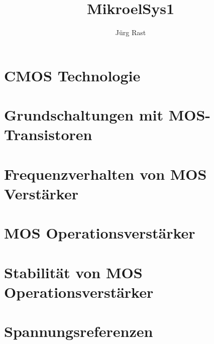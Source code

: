 \documentclass[titlepage=true]{scrartcl}
\title{MikroelSys1}
\author{Jürg Rast}
\begin{document}

\tableofcontents
\newpage

\section{CMOS Technologie}





\section{Grundschaltungen mit MOS-Transistoren}









\section{Frequenzverhalten von MOS Verstärker}

\section{MOS Operationsverstärker}

\section{Stabilität von MOS Operationsverstärker}

%

\section{Spannungsreferenzen}
\end{document}
